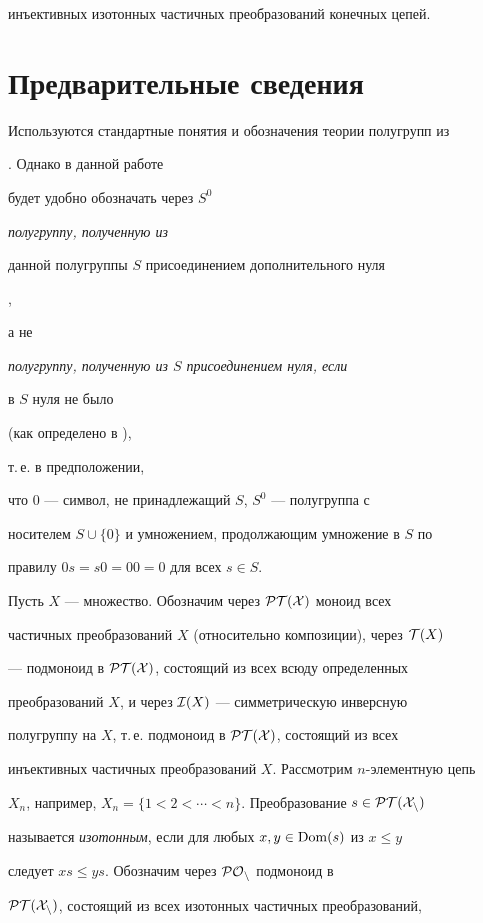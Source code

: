 инъективных изотонных частичных преобразований конечных цепей.





\section{Предварительные сведения}





Используются стандартные понятия и обозначения теории полугрупп из


\cite{HOWIE2}. Однако в данной работе


будет удобно обозначать через $S^0$ {\it полугруппу, полученную из


данной полугруппы $S$ присоединением дополнительного нуля},


а не {\it полугруппу, полученную из $S$ присоединением нуля, если


в $S$ нуля не было\/} (как определено в \cite{HOWIE2}),


т.\,е. в предположении,


что $0$ --- символ, не принадлежащий  $S$, $S^0$ --- полугруппа с


носителем $S\cup\{0\}$ и умножением, продолжающим умножение в $S$ по


правилу $0s=s0=00=0$ для всех $s\in S$.





Пусть $X$ --- множество. Обозначим через $\cal{PT}(X)$ моноид всех


частичных преобразований $X$ (относительно композиции), через ${\cal T}(X)$


--- подмоноид в $\cal{PT}(X)$, состоящий из всех всюду определенных


преобразований $X$, и через ${\cal I}(X)$ --- симметрическую инверсную


полугруппу на $X$, т.\,е. подмоноид в $\cal{ PT}(X)$, состоящий из всех


инъективных частичных преобразований $X$. Рассмотрим $n$-элементную цепь


$X_n$, например, $X_n=\{1<2<\dotsb<n\}$. Преобразование $s\in\cal{PT}(X_n)$


называется {\it изотонным}, если для любых $x,y\in \operatorname{Dom}(s)$ из $x\leq y$


следует $xs\leq ys$. Обозначим через $\cal{ PO}_n$ подмоноид в


$\cal{ PT}(X_n)$, состоящий из всех изотонных частичных преобразований,


